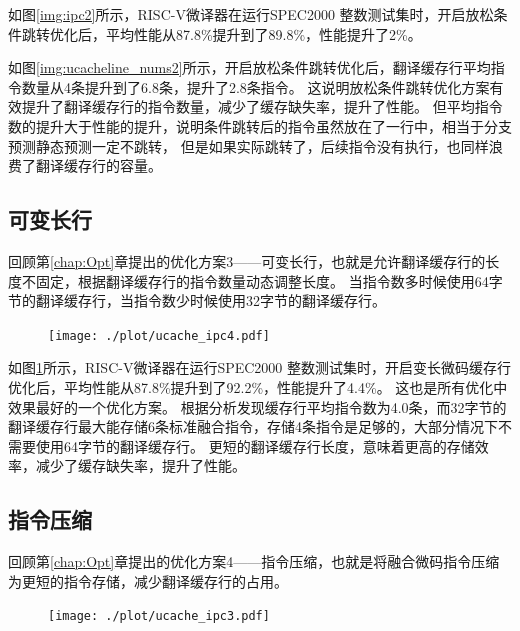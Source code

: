 如图\ref{img:ipc2}所示，RISC-V微译器在运行SPEC2000 整数测试集时，开启放松条件跳转优化后，平均性能从87.8\%提升到了89.8\%，性能提升了2\%。

如图\ref{img:ucacheline_nums2}所示，开启放松条件跳转优化后，翻译缓存行平均指令数量从4条提升到了6.8条，提升了2.8条指令。
这说明放松条件跳转优化方案有效提升了翻译缓存行的指令数量，减少了缓存缺失率，提升了性能。
但平均指令数的提升大于性能的提升，说明条件跳转后的指令虽然放在了一行中，相当于分支预测静态预测一定不跳转，
但是如果实际跳转了，后续指令没有执行，也同样浪费了翻译缓存行的容量。


\subsection{可变长行}

回顾第\ref{chap:Opt}章提出的优化方案3——可变长行，也就是允许翻译缓存行的长度不固定，根据翻译缓存行的指令数量动态调整长度。
当指令数多时候使用64字节的翻译缓存行，当指令数少时候使用32字节的翻译缓存行。

\begin{figure}[!htbp]
  \centering
  \texttt{[image: ./plot/ucache\_ipc4.pdf]}
  \label{img:ipc4}
\end{figure}


如图\ref{img:ipc4}所示，RISC-V微译器在运行SPEC2000 整数测试集时，开启变长微码缓存行优化后，平均性能从87.8\%提升到了92.2\%，性能提升了4.4\%。
这也是所有优化中效果最好的一个优化方案。
根据分析发现缓存行平均指令数为4.0条，而32字节的翻译缓存行最大能存储6条标准融合指令，存储4条指令是足够的，大部分情况下不需要使用64字节的翻译缓存行。
更短的翻译缓存行长度，意味着更高的存储效率，减少了缓存缺失率，提升了性能。

\subsection{指令压缩}

回顾第\ref{chap:Opt}章提出的优化方案4——指令压缩，也就是将融合微码指令压缩为更短的指令存储，减少翻译缓存行的占用。

\begin{figure}[!htbp]
  \centering
  \texttt{[image: ./plot/ucache\_ipc3.pdf]}
  \label{img:ipc3}
\end{figure}

